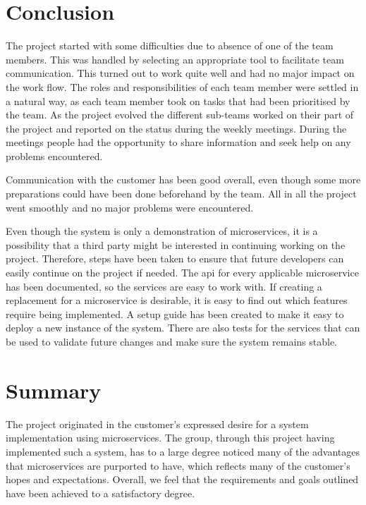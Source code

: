 \section{Conclusion}
The project started with some difficulties due to absence of one of the team members. This was handled by selecting an appropriate tool to facilitate team communication. This turned out to work quite well and had no major impact on the work flow. The roles and responsibilities of each team member were settled in a natural way, as each team member took on tasks that had been prioritised by the team. As the project evolved the different sub-teams worked on their part of the project and reported on the status during the weekly meetings. During the meetings people had the opportunity to share information and seek help on any problems encountered. 

Communication with the customer has been good overall, even though some more preparations could have been done beforehand by the team. All in all the project went smoothly and no major problems were encountered. 

Even though the system is only a demonstration of microservices, it is a possibility that a third party might be interested in continuing working on the project. Therefore, steps have been taken to ensure that future developers can easily continue on the project if needed. The \acrshort{api} for every applicable microservice has been documented, so the services are easy to work with. If creating a replacement for a microservice is desirable, it is easy to find out which features require being implemented. A setup guide has been created to make it easy to deploy a new instance of the system. There are also tests for the services that can be used to validate future changes and make sure the system remains stable.


\section{Summary}

The project originated in the customer's expressed desire for a system implementation using microservices.
The group, through this project having implemented such a system, has to a large degree noticed many of the advantages that microservices are purported to have, which reflects many of the customer's hopes and expectations. %
Overall, we feel that the requirements and goals outlined have been achieved to a satisfactory degree.
